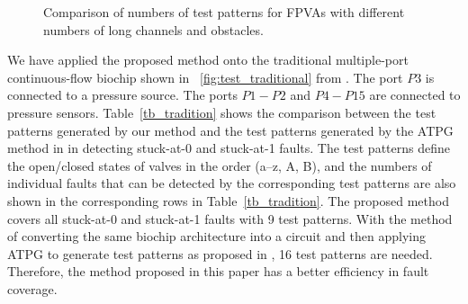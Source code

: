 \documentclass[journal,twoside]{IEEEtran}
\begin{document}
\begin{figure}[t]
{

\caption{Comparison of numbers of test patterns for FPVAs with different numbers of long channels and obstacles.}
\label{fig:wall_hole_test}
}
\end{figure}

We have applied the proposed method onto the traditional multiple-port
continuous-flow biochip shown 
in \figname~\ref{fig:test_traditional} from \cite{HuYHC14}. The port $P3$
is connected to a pressure source. The ports $P1-P2$ and $P4-P15$ are connected
to pressure sensors. 
Table~\ref{tb_tradition} shows the comparison between the test patterns generated by our
method and the test patterns generated by the ATPG method in \cite{HuYHC14} in
detecting stuck-at-0 and stuck-at-1 faults.
The test patterns define the open/closed states
of valves in the order (a--z, A, B), and the numbers of
individual faults that can be detected by the corresponding test patterns are
also shown in the corresponding rows in Table~\ref{tb_tradition}.
The proposed method covers all stuck-at-0 and stuck-at-1 faults with 9 test patterns. 
With the method of converting the same biochip architecture into a circuit 
and then applying ATPG to generate test patterns as proposed in \cite{HuYHC14}, 
16 test patterns are needed. Therefore, the method proposed in this paper has a
better efficiency in fault coverage. 
\end{document}

